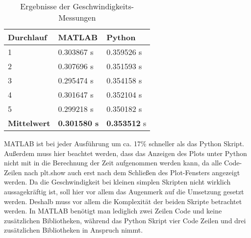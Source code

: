 \begin{minipage}{\linewidth}

\end{minipage}
\begin{minipage}{\linewidth}

\end{minipage}

\begin{table}[H]
	\centering
	\begin{tabular}{|l|l|l|}
		\multicolumn{1}{l}{\textbf{Durchlauf}} & \multicolumn{1}{l}{\textbf{MATLAB}} & \multicolumn{1}{l}{\textbf{Python}}  \\ 
		\hline
		1                                      & 0.303867 s                          & 0.359526
		s                           \\ 
		\hline
		2                                      & 0.307696
		s                          & 0.351593
		s                           \\ 
		\hline
		3                                      & 0.295474
		s                          & 0.354158
		s                           \\ 
		\hline
		4                                      & 0.301647 s                          & 0.352104 s                           \\ 
		\hline
		5                                      & 0.299218 s                          & 0.350182 s                           \\ 
		\hline
		\textbf{Mittelwert}                    & \textbf{0.301580 s}                          & \textbf{0.353512} s                           \\
		\hline
	\end{tabular}
		\caption{Ergebnisse der Geschwindigkeits-Messungen}
\end{table}

MATLAB ist bei jeder Ausführung um ca. 17\% schneller als das Python Skript. Außerdem muss hier beachtet werden, dass das Anzeigen des Plots unter Python nicht mit in die Berechnung der Zeit aufgenommen werden kann, da alle Code-Zeilen nach \glqq plt.show\grqq{} auch erst nach dem Schließen des Plot-Fensters angezeigt werden. Da die Geschwindigkeit bei kleinen simplen Skripten nicht wirklich aussagekräftig ist, soll hier vor allem das Augenmerk auf die Umsetzung gesetzt werden. Deshalb muss vor allem die Komplexität der beiden Skripte betrachtet werden. In MATLAB benötigt man lediglich zwei Zeilen Code und keine zusätzlichen Bibliotheken, während das Python Skript vier Code Zeilen und drei zusätzlichen Bibliotheken in Anspruch nimmt.

